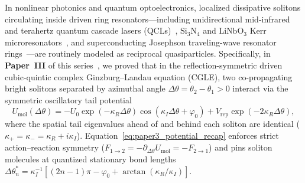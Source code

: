 \documentclass[11pt,letterpaper]{article}
\begin{document}
In nonlinear photonics and quantum optoelectronics, localized dissipative solitons circulating inside driven ring resonators---including unidirectional mid-infrared and terahertz quantum cascade lasers (QCLs)~\cite{Piccardo2020,Meng2022,Kazakov2025,ColumboRoadmap2025}, $\mathrm{Si_3N_4}$ and $\mathrm{LiNbO_3}$ Kerr microresonators~\cite{Kippenberg2018,Taheri2022,Skryabin2020}, and superconducting Josephson traveling-wave resonator rings~\cite{Macklin2015,Planat2020}---are routinely modeled as reciprocal quasiparticles. Specifically, in \textbf{Paper~III} of this series~\cite{OwnbyPaper3_2026}, we proved that in the reflection-symmetric driven cubic-quintic complex Ginzburg--Landau equation (CGLE), two co-propagating bright solitons separated by azimuthal angle $\Delta\theta = \theta_2 - \theta_1 > 0$ interact via the symmetric oscillatory tail potential
\begin{equation}
U_{\mathrm{mol}}(\Delta\theta) = -U_0 \exp(-\kappa_R \Delta\theta)\cos(\kappa_I \Delta\theta + \varphi_0) + V_{\mathrm{rep}}\exp(-2\kappa_R \Delta\theta),
\label{eq:paper3_potential_recap}
\end{equation}
where the spatial tail eigenvalues ahead of and behind each soliton are identical ($\kappa_+ = \kappa_- = \kappa_R + i\kappa_I$). Equation~\eqref{eq:paper3_potential_recap} enforces strict action--reaction symmetry ($F_{1\to 2} = -\partial_{\Delta\theta}U_{\mathrm{mol}} = -F_{2\to 1}$) and pins soliton molecules at quantized stationary bond lengths $\Delta\theta_n^* = \kappa_I^{-1}[(2n-1)\pi - \varphi_0 + \arctan(\kappa_R/\kappa_I)]$.
\end{document}
